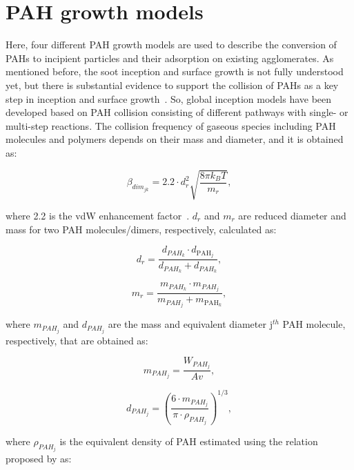 
\section{PAH growth models}
\label{sec:pahgrowmodel}
Here, four different PAH growth models are used to describe the conversion of PAHs to incipient particles and their adsorption on existing agglomerates. As mentioned before, the soot inception and surface growth is not fully understood yet, but there is substantial evidence to support the collision of PAHs as a key step in inception and surface growth~\citep{zhao2003measurement, abid2009quantitative, happold2009soot}. So, global inception models have been developed based on PAH collision consisting of different pathways with single- or multi-step reactions. The collision frequency of gaseous species including PAH molecules and polymers depends on their mass and diameter, and it is obtained as:

\begin{equation}
	\beta_{dim_{jk}}=
	2.2 \cdot d^2_{r} \sqrt{\frac{8 \pi k_B T}{m_{r}}},
	\label{eqn:betadim}
\end{equation}

\noindent where 2.2 is the vdW enhancement factor~\citep{kholghy2018reactive}. ${d_{r}}$ and ${m_{r}}$ are reduced diameter and mass for two PAH molecules/dimers, respectively, calculated as:

\begin{equation}
	d_{r}=
	\frac{d_{{PAH}_k}\cdot d_{\mathrm{PAH}_j}}{d_{{PAH}_k}+d_{{PAH}_k}},
	\label{eqn:drPAH}
\end{equation}

\begin{equation}
	m_{r}=
		\frac{m_{{PAH}_k}\cdot m_{{PAH}_j}}{m_{{PAH}_j}+ m_{\mathrm{PAH}_k}},
	\label{eqn:mrPAH}
\end{equation}

\noindent where $m_{PAH_j}$ and $d_{PAH_j}$ are the mass and equivalent diameter $\mathrm{j}^{th}$ PAH molecule, respectively, that are obtained as:

\begin{equation}
	m_{PAH_j}=
	\frac{W_{{PAH}_j}}{Av},
	\label{eqn:mPAH}
\end{equation}

\begin{equation}
	d_{PAH_j}=
	\left(
		\frac{6\cdot m_{{PAH}_j}}{\pi\cdot\rho_{{PAH}_j}}
	\right)^{1/3},
	\label{eqn:dPAH}
\end{equation}

\noindent where $\rho_{PAH_j}$ is the equivalent density of PAH estimated using the relation proposed by \citet{johansson2016formation} as:

